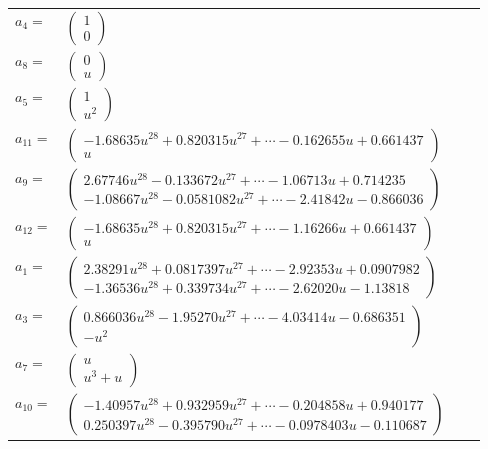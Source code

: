 \documentclass[1p]{elsarticle_modified}
\theoremstyle{definition}
\begin{document}
\begin{tabular}{m{7pt} m{180pt} m{7pt} m{180pt} }
\flushright $a_{4}=$&$\begin{pmatrix}1\\0\end{pmatrix}$ \\
\flushright $a_{8}=$&$\begin{pmatrix}0\\u\end{pmatrix}$ \\
\flushright $a_{5}=$&$\begin{pmatrix}1\\u^2\end{pmatrix}$ \\
\flushright $a_{11}=$&$\begin{pmatrix}-1.68635 u^{28}+0.820315 u^{27}+\cdots-0.162655 u+0.661437\\u\end{pmatrix}$ \\
\flushright $a_{9}=$&$\begin{pmatrix}2.67746 u^{28}-0.133672 u^{27}+\cdots-1.06713 u+0.714235\\-1.08667 u^{28}-0.0581082 u^{27}+\cdots-2.41842 u-0.866036\end{pmatrix}$ \\
\flushright $a_{12}=$&$\begin{pmatrix}-1.68635 u^{28}+0.820315 u^{27}+\cdots-1.16266 u+0.661437\\u\end{pmatrix}$ \\
\flushright $a_{1}=$&$\begin{pmatrix}2.38291 u^{28}+0.0817397 u^{27}+\cdots-2.92353 u+0.0907982\\-1.36536 u^{28}+0.339734 u^{27}+\cdots-2.62020 u-1.13818\end{pmatrix}$ \\
\flushright $a_{3}=$&$\begin{pmatrix}0.866036 u^{28}-1.95270 u^{27}+\cdots-4.03414 u-0.686351\\- u^2\end{pmatrix}$ \\
\flushright $a_{7}=$&$\begin{pmatrix}u\\u^3+u\end{pmatrix}$ \\
\flushright $a_{10}=$&$\begin{pmatrix}-1.40957 u^{28}+0.932959 u^{27}+\cdots-0.204858 u+0.940177\\0.250397 u^{28}-0.395790 u^{27}+\cdots-0.0978403 u-0.110687\end{pmatrix}$ \\

\end{tabular}
\end{document}

